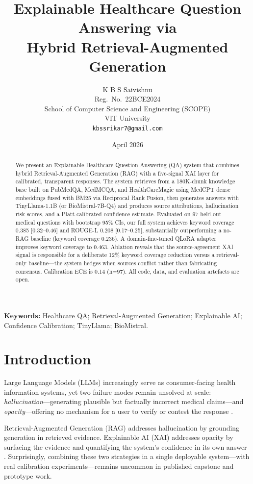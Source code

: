 \documentclass[10pt,twocolumn]{article}
\title{\textbf{Explainable Healthcare Question Answering via\\
Hybrid Retrieval-Augmented Generation}}
\author{
  K B S Saivishnu\\
  \small Reg.~No.~22BCE2024\\
  \small School of Computer Science and Engineering (SCOPE)\\
  \small VIT University\\
  \small \texttt{kbssrikar7@gmail.com}
}
\date{April 2026}
\begin{document}
\maketitle

\begin{abstract}
We present an Explainable Healthcare Question Answering (QA) system that
combines hybrid Retrieval-Augmented Generation (RAG) with a five-signal XAI
layer for calibrated, transparent responses.  The system retrieves from a
180K-chunk knowledge base built on PubMedQA, MedMCQA, and HealthCareMagic
using MedCPT dense embeddings fused with BM25 via Reciprocal Rank Fusion,
then generates answers with TinyLlama-1.1B (or BioMistral-7B-Q4) and
produces source attributions, hallucination risk scores, and a Platt-calibrated
confidence estimate.  Evaluated on 97 held-out medical questions with
bootstrap 95\% CIs, our full system achieves keyword coverage 0.385
[0.32--0.46] and ROUGE-L 0.208 [0.17--0.25], substantially outperforming
a no-RAG baseline (keyword coverage 0.236).  A domain-fine-tuned QLoRA
adapter improves keyword coverage to 0.463.  Ablation reveals that the
source-agreement XAI signal is responsible for a deliberate 12\% keyword
coverage reduction versus a retrieval-only baseline---the system hedges
when sources conflict rather than fabricating consensus.  Calibration
ECE is 0.14 (n=97).  All code, data, and evaluation artefacts are open.
\end{abstract}

\textbf{Keywords:} Healthcare QA; Retrieval-Augmented Generation;
Explainable AI; Confidence Calibration; TinyLlama; BioMistral.

\section{Introduction}
\label{sec:intro}

Large Language Models (LLMs) increasingly serve as consumer-facing health
information systems, yet two failure modes remain unsolved at scale:
\emph{hallucination}---generating plausible but factually incorrect medical
claims---and \emph{opacity}---offering no mechanism for a user to verify or
contest the response \cite{singhal2023large,thirunavukarasu2023}.

Retrieval-Augmented Generation (RAG) \cite{lewis2020rag} addresses
hallucination by grounding generation in retrieved evidence.  Explainable AI
(XAI) addresses opacity by surfacing the evidence and quantifying the system's
confidence in its own answer \cite{amann2020xai}.  Surprisingly, combining
these two strategies in a single deployable system---with real calibration
experiments---remains uncommon in published capstone and prototype work.
\end{document}
